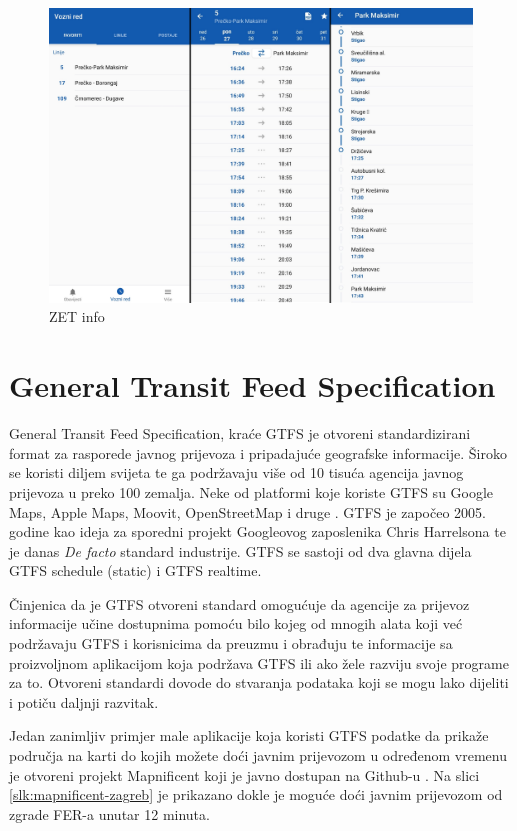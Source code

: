 \documentclass[zavrsnirad]{fer}
\begin{document}
\begin{figure}[htb]
	\centering
	\includegraphics[width=0.85\linewidth]{Figures/zetinfo.png} 
	\caption{ZET info}
	\label{slk:zet-info}
\end{figure}

\newpage
\section[GTFS]{General Transit Feed Specification}
\label{sec:GTFS}

General Transit Feed Specification, kraće GTFS je otvoreni standardizirani format za rasporede
javnog prijevoza i pripadajuće geografske informacije. Široko se koristi diljem svijeta te ga
podržavaju više od 10 tisuća agencija javnog prijevoza u preko 100 zemalja. Neke od platformi koje
koriste GTFS su Google Maps, Apple Maps, Moovit, OpenStreetMap i druge \cite{GTFS}. GTFS je započeo 2005. godine kao ideja za sporedni projekt Googleovog zaposlenika Chris Harrelsona te je danas \textit{De facto} standard industrije. GTFS se sastoji od dva glavna dijela GTFS schedule (static) i GTFS realtime.

Činjenica da je GTFS otvoreni standard omogućuje da agencije za prijevoz informacije učine dostupnima pomoću bilo kojeg od mnogih alata koji već podržavaju GTFS i korisnicima da preuzmu i obrađuju te informacije sa proizvoljnom aplikacijom koja podržava GTFS ili ako žele razviju svoje programe za to. Otvoreni standardi dovode do stvaranja podataka koji se mogu lako dijeliti i potiču daljnji razvitak.

Jedan zanimljiv primjer male aplikacije koja koristi GTFS podatke da prikaže područja na karti do kojih možete doći javnim prijevozom u određenom vremenu je otvoreni projekt Mapnificent koji je javno dostupan na Github-u \cite{Mapnificent}. Na slici \ref{slk:mapnificent-zagreb} je prikazano dokle je moguće doći javnim prijevozom od zgrade FER-a unutar 12 minuta. 
\end{document}
